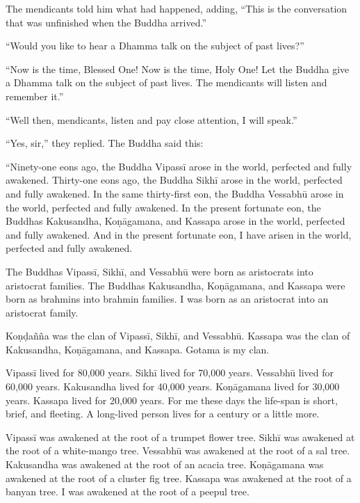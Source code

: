 \documentclass[12pt,openany]{book}%
\begin{document}
The mendicants told him what had happened, adding, “This is the conversation that was unfinished when the Buddha arrived.” 

“Would you like to hear a Dhamma talk on the subject of past lives?” 

“Now is the time, Blessed One! Now is the time, Holy One! Let the Buddha give a Dhamma talk on the subject of past lives. The mendicants will listen and remember it.” 

“Well then, mendicants, listen and pay close attention, I will speak.” 

“Yes, sir,” they replied. The Buddha said this: 

“Ninety-one eons ago, the Buddha \textsanskrit{Vipassī} arose in the world, perfected and fully awakened. Thirty-one eons ago, the Buddha \textsanskrit{Sikhī} arose in the world, perfected and fully awakened. In the same thirty-first eon, the Buddha \textsanskrit{Vessabhū} arose in the world, perfected and fully awakened. In the present fortunate eon, the Buddhas Kakusandha, \textsanskrit{Koṇāgamana}, and Kassapa arose in the world, perfected and fully awakened. And in the present fortunate eon, I have arisen in the world, perfected and fully awakened. 

The Buddhas \textsanskrit{Vipassī}, \textsanskrit{Sikhī}, and \textsanskrit{Vessabhū} were born as aristocrats into aristocrat families. The Buddhas Kakusandha, \textsanskrit{Koṇāgamana}, and Kassapa were born as brahmins into brahmin families. I was born as an aristocrat into an aristocrat family. 

\textsanskrit{Koṇḍañña} was the clan of \textsanskrit{Vipassī}, \textsanskrit{Sikhī}, and \textsanskrit{Vessabhū}. Kassapa was the clan of Kakusandha, \textsanskrit{Koṇāgamana}, and Kassapa. Gotama is my clan. 

\textsanskrit{Vipassī} lived for 80,000 years. \textsanskrit{Sikhī} lived for 70,000 years. \textsanskrit{Vessabhū} lived for 60,000 years. Kakusandha lived for 40,000 years. \textsanskrit{Koṇāgamana} lived for 30,000 years. Kassapa lived for 20,000 years. For me these days the life-span is short, brief, and fleeting. A long-lived person lives for a century or a little more. 

\textsanskrit{Vipassī} was awakened at the root of a trumpet flower tree. \textsanskrit{Sikhī} was awakened at the root of a white-mango tree. \textsanskrit{Vessabhū} was awakened at the root of a sal tree. Kakusandha was awakened at the root of an acacia tree. \textsanskrit{Koṇāgamana} was awakened at the root of a cluster fig tree. Kassapa was awakened at the root of a banyan tree. I was awakened at the root of a peepul tree. 
\end{document}

